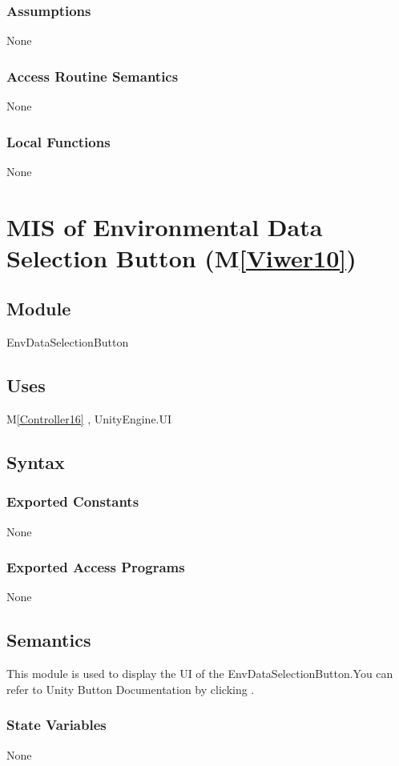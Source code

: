 \documentclass[12pt, titlepage]{article}
\newcommand{\mref}[1]{M\ref{#1}}
\begin{document}
\subsubsection{Assumptions}
None
\subsubsection{Access Routine Semantics}
None
\subsubsection{Local Functions}
None


\newpage

\section{MIS of Environmental Data Selection Button
 (\mref{Viwer10})}

\subsection{Module}
EnvDataSelectionButton

\subsection{Uses}
\mref{Controller16}  , UnityEngine.UI

\subsection{Syntax}
\subsubsection{Exported Constants}
None
\subsubsection{Exported Access Programs}
None

\subsection{Semantics}
This module is used to display the UI of the EnvDataSelectionButton.You can refer to Unity Button Documentation by clicking \bref.
\subsubsection{State Variables}
None
\end{document}
